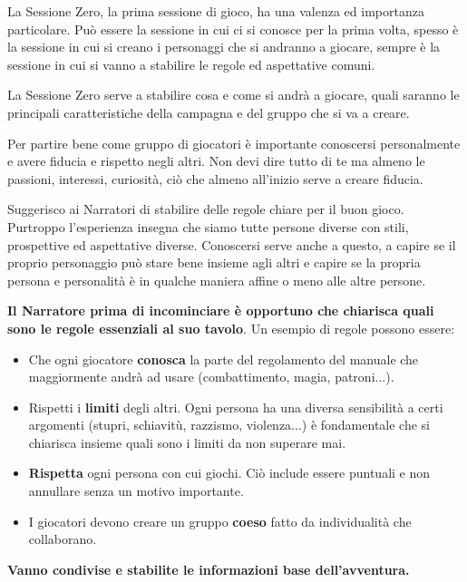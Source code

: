 \begin{multicols}{2}
La Sessione Zero, la prima sessione di gioco, ha una valenza ed importanza particolare. Può essere la sessione in cui ci si conosce per la prima volta, spesso è la sessione in cui si creano i personaggi che si andranno a giocare, sempre è la sessione in cui si vanno a stabilire le regole ed aspettative comuni.

La Sessione Zero serve a stabilire cosa e come si andrà a giocare, quali saranno le principali caratteristiche della campagna e del gruppo che si va a creare.

Per partire bene come gruppo di giocatori è importante conoscersi personalmente e avere fiducia e rispetto negli altri. Non devi dire tutto di te ma almeno le passioni, interessi, curiosità, ciò che almeno all'inizio serve a creare fiducia.

Suggerisco ai Narratori di stabilire delle regole chiare per il buon gioco. Purtroppo l'esperienza insegna che siamo tutte persone diverse con stili, prospettive ed aspettative diverse. Conoscersi serve anche a questo, a capire se il proprio personaggio può stare bene insieme agli altri e capire se la propria persona e personalità è in qualche maniera affine o meno alle altre persone.

\textbf{Il Narratore prima di incominciare è opportuno che chiarisca quali sono le regole essenziali al suo tavolo}. Un esempio di regole possono essere:

\begin{itemize}[leftmargin=*] \setlength{\itemsep}{0pt}

\item Che ogni giocatore \textbf{conosca} la parte del regolamento del manuale che maggiormente andrà ad usare (combattimento, magia, patroni...).
\item Rispetti i \textbf{limiti} degli altri. Ogni persona ha una diversa sensibilità a certi argomenti (stupri, schiavitù, razzismo, violenza...) è fondamentale che si chiarisca insieme quali sono i limiti da non superare mai.
\item \textbf{Rispetta} ogni persona con cui giochi. Ciò include essere puntuali e non annullare senza un motivo importante.
\item I giocatori devono creare un gruppo \textbf{coeso} fatto da individualità che collaborano.
\end{itemize}

\textbf{Vanno condivise e stabilite le informazioni base dell'avventura.}

\medskip


\end{multicols}
